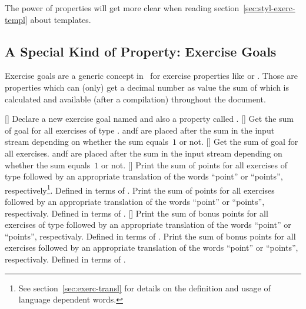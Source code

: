 \documentclass[load-preamble+]{cnltx-doc}
\begin{document}
The power of properties will get more clear when reading
section~\vref{sec:styl-exerc-templ} about templates.

\subsection{A Special Kind of Property: Exercise Goals}

Exercise goals are a generic concept in \xsim\ for exercise properties like
 or .  Those are properties which can
(only) get a decimal number as value the sum of which is calculated and
available (after a compilation) throughout the document.
\begin{commands}
  []
    Declare a new exercise goal named  and also a property called
    .
  []
    Get the sum of goal  for all exercises of type .
     andf  are placed after the sum in the input
    stream depending on whether the sum equals~$1$ or not.
  []
    Get the sum of goal  for all exercises.  andf
     are placed after the sum in the input stream depending on
    whether the sum equals~$1$ or not.
  []
    Print the sum of points for all exercises of type  followed by
    an appropriate translation of the words \enquote{point} or
    \enquote{points}, respectively\footnote{See section~\vref{sec:exerc-transl}
      for details on the definition and usage of language dependent words.}.
    Defined in terms of .
    Print the sum of points for all exercises followed by an appropriate
    translation of the words \enquote{point} or \enquote{points},
    respectivaly.  Defined in terms of .
  []
    Print the sum of bonus points for all exercises of type 
    followed by an appropriate translation of the words \enquote{point} or
    \enquote{points}, respectivaly.  Defined in terms of
    .
    Print the sum of bonus points for all exercises followed by an appropriate
    translation of the words \enquote{point} or \enquote{points},
    respectivaly.  Defined in terms of .
\end{commands}
\end{document}
